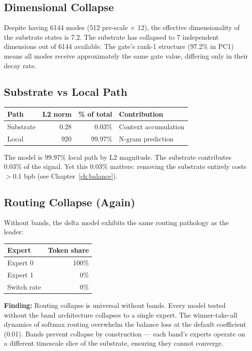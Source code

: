\documentclass[11pt,a4paper]{report}
\newcommand{\finding}[1]{\textcolor{finding}{\textbf{Finding:}} #1}
\begin{document}
\subsection{Dimensional Collapse}

Despite having 6144 modes (512 pre-scale $\times$ 12), the effective dimensionality of the substrate states is 7.2. The substrate has collapsed to 7 independent dimensions out of 6144 available. The gate's rank-1 structure (97.2\% in PC1) means all modes receive approximately the same gate value, differing only in their decay rate.

\subsection{Substrate vs Local Path}

\begin{center}
\begin{tabular}{lrrl}
\toprule
Path & L2 norm & \% of total & Contribution \\
\midrule
Substrate & 0.28 & 0.03\% & Context accumulation \\
Local & 920 & 99.97\% & N-gram prediction \\
\bottomrule
\end{tabular}
\end{center}

The model is 99.97\% local path by L2 magnitude. The substrate contributes 0.03\% of the signal. Yet this 0.03\% matters: removing the substrate entirely costs $>$0.1 bpb (see Chapter~\ref{ch:balance}).

\subsection{Routing Collapse (Again)}

Without bands, the delta model exhibits the same routing pathology as the leader:

\begin{center}
\begin{tabular}{lr}
\toprule
Expert & Token share \\
\midrule
Expert 0 & 100\% \\
Expert 1 & 0\% \\
Switch rate & 0\% \\
\bottomrule
\end{tabular}
\end{center}

\finding{Routing collapse is universal without bands.} Every model tested without the band architecture collapses to a single expert. The winner-take-all dynamics of softmax routing overwhelm the balance loss at the default coefficient (0.01). Bands prevent collapse by construction --- each band's experts operate on a different timescale slice of the substrate, ensuring they cannot converge.
\end{document}
